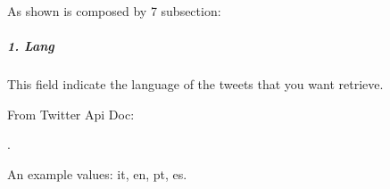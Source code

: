 \documentclass[letterpaper,10pt,english]{sphinxmanual}
\begin{document}
\sphinxAtStartPar
As shown is composed by 7 sub\sphinxhyphen{}section:
\begin{quote}

\begin{DUlineblock}{0em}
\item[] {\hyperref[\detokenize{guide/tweet_search_guide:lang}]{}}
\item[] {\hyperref[\detokenize{guide/tweet_search_guide:context-annotation}]{}}
\item[] {\hyperref[\detokenize{guide/tweet_search_guide:number-of-results}]{}}
\item[] {\hyperref[\detokenize{guide/tweet_search_guide:reach-all-tweets}]{}}
\item[] {\hyperref[\detokenize{guide/tweet_search_guide:time}]{}}
\item[] {\hyperref[\detokenize{guide/tweet_search_guide:geo}]{}}
\item[] {\hyperref[\detokenize{guide/tweet_search_guide:filter-retweet}]{}}
\end{DUlineblock}
\end{quote}


\subparagraph{1. Lang}
\label{\detokenize{guide/tweet_search_guide:lang}}
\begin{sphinxVerbatim}[commandchars=\\\{\}]
\end{sphinxVerbatim}

\sphinxAtStartPar
This field indicate the language of the tweets that you
want retrieve.

\begin{DUlineblock}{0em}
\item[] From Twitter Api Doc:
\end{DUlineblock}

\sphinxAtStartPar
{}  .

\begin{DUlineblock}{0em}
\item[] An example values: it, en, pt, es.
\end{DUlineblock}
\end{document}
